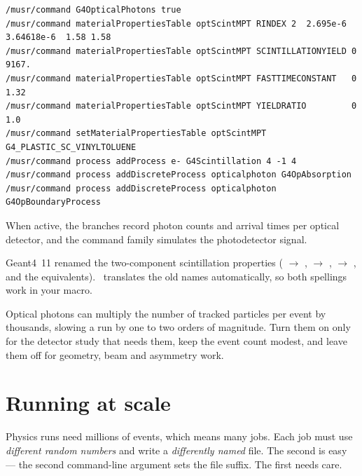 \begin{lstlisting}[style=mac,caption={Optical properties of a plastic scintillator (shortened from \texttt{110.mac}; photon energies in MeV)}]
/musr/command G4OpticalPhotons true
/musr/command materialPropertiesTable optScintMPT RINDEX 2  2.695e-6 3.64618e-6  1.58 1.58
/musr/command materialPropertiesTable optScintMPT SCINTILLATIONYIELD 0 9167.
/musr/command materialPropertiesTable optScintMPT FASTTIMECONSTANT   0 1.32
/musr/command materialPropertiesTable optScintMPT YIELDRATIO         0 1.0
/musr/command setMaterialPropertiesTable optScintMPT G4_PLASTIC_SC_VINYLTOLUENE
/musr/command process addProcess e- G4Scintillation 4 -1 4
/musr/command process addDiscreteProcess opticalphoton G4OpAbsorption
/musr/command process addDiscreteProcess opticalphoton G4OpBoundaryProcess
\end{lstlisting}

When active, the  branches record photon counts and arrival times per optical detector, and the  command family simulates the photodetector signal.

\begin{checkbuild}
Geant4~11 renamed the two-component scintillation properties ( \(\rightarrow\) ,  \(\rightarrow\) ,  \(\rightarrow\) , and the  equivalents). \musrSim\ translates the old names automatically, so both spellings work in your macro.
\end{checkbuild}

\begin{pitfall}
Optical photons can multiply the number of tracked particles per event by thousands, slowing a run by one to two orders of magnitude. Turn them on only for the detector study that needs them, keep the event count modest, and leave them off for geometry, beam and asymmetry work.
\end{pitfall}

\section{Running at scale}
\label{sec:scale}
Physics runs need millions of events, which means many jobs. Each job must use \emph{different random numbers} and write a \emph{differently named} file. The second is easy --- the second command-line argument sets the file suffix. The first needs care.

